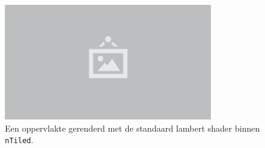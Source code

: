 \begin{figure}
  \centering
  \includegraphics[width=0.8\textwidth]{./img/raw/placeholder.png}
  \caption{Een oppervlakte gerenderd met de standaard lambert shader binnen \texttt{nTiled}.}
  \label{fig:imp-lambert}
\end{figure}
